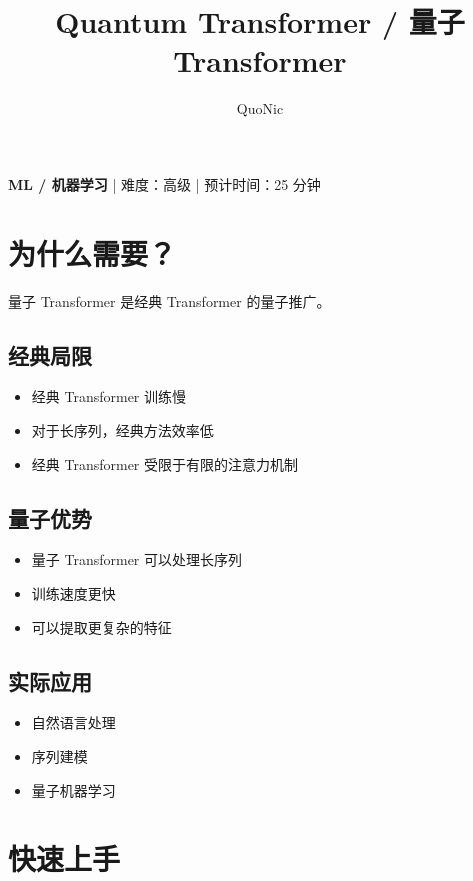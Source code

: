 \documentclass[12pt,a4paper]{article}
\title{Quantum Transformer / 量子 Transformer}
\author{QuoNic}
\date{}
\begin{document}
\maketitle

\begin{center}
\textbf{ML / 机器学习} | 难度：高级 | 预计时间：25 分钟
\end{center}

\tableofcontents
\newpage

\section{为什么需要？}

量子 Transformer 是经典 Transformer 的量子推广。

\subsection{经典局限}
\begin{itemize}
  \item 经典 Transformer 训练慢
  \item 对于长序列，经典方法效率低
  \item 经典 Transformer 受限于有限的注意力机制
\end{itemize}

\subsection{量子优势}
\begin{itemize}
  \item 量子 Transformer 可以处理长序列
  \item 训练速度更快
  \item 可以提取更复杂的特征
\end{itemize}

\subsection{实际应用}
\begin{itemize}
  \item 自然语言处理
  \item 序列建模
  \item 量子机器学习
\end{itemize}

\section{快速上手}
\end{document}
